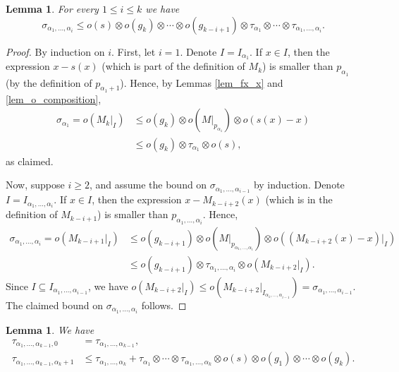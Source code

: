 \documentclass{article}
\newtheorem{Lemma}[Theorem]{Lemma}
\theoremstyle{definition}
\begin{document}
\begin{Lemma}\label{lem_sigma}
    For every $1\le i\le k$ we have
    \begin{equation*}
    \sigma_{\alpha_1,\ldots,\alpha_i}\le o(s)\otimes o(g_k)\otimes\cdots\otimes o(g_{k-i+1})\otimes \tau_{\alpha_1}\otimes\cdots\otimes \tau_{\alpha_1,\ldots,\alpha_i}.
    \end{equation*}
\end{Lemma}

\begin{proof}
    By induction on $i$. First, let $i=1$. Denote $I=I_{\alpha_1}$. If $x\in I$, then the expression $x-s(x)$ (which is part of the definition of $M_k$) is smaller than $p_{\alpha_1}$ (by the definition of $p_{\alpha_1+1}$). Hence, by Lemmas \ref{lem_fx_x} and \ref{lem_o_composition},
    \begin{align*}
        \sigma_{\alpha_1} = o(M_k|_I)&\le o(g_k)\otimes o(M|_{p_{\alpha_1}})\otimes o(s(x)-x)\\
        &\le o(g_k)\otimes \tau_{\alpha_1}\otimes o(s),
    \end{align*}
    as claimed.

    Now, suppose $i\ge 2$, and assume the bound on $\sigma_{\alpha_1,\ldots,\alpha_{i-1}}$ by induction. Denote $I=I_{\alpha_1,\ldots,\alpha_i}$. If $x\in I$, then the expression $x-M_{k-i+2}(x)$ (which is in the definition of $M_{k-i+1}$) is smaller than $p_{\alpha_1,\ldots,\alpha_i}$. Hence,
    \begin{align*}
        \sigma_{\alpha_1,\ldots,\alpha_i}=o(M_{k-i+1}|_{I})&\le o(g_{k-i+1})\otimes o(M|_{p_{\alpha_1,\ldots,\alpha_i}})\otimes o((M_{k-i+2}(x)-x)|_{I})\\
        &\le o(g_{k-i+1})\otimes\tau_{\alpha_1,\ldots,\alpha_i}\otimes o(M_{k-i+2}|_I).
    \end{align*}
    Since $I\subseteq I_{\alpha_1,\ldots,\alpha_{i-1}}$, we have $o(M_{k-i+2}|_I)\le o(M_{k-i+2}|_{I_{\alpha_1,\ldots,\alpha_{i-1}}}) = \sigma_{\alpha_1,\ldots,\alpha_{i-1}}$. The claimed bound on $\sigma_{\alpha_1,\ldots,\alpha_i}$ follows.
\end{proof}

\begin{Lemma}
    We have
    \begin{align*}
        \tau_{\alpha_1,\ldots,\alpha_{k-1},0}&=\tau_{\alpha_1,\ldots,\alpha_{k-1}},\\
        \tau_{\alpha_1,\ldots,\alpha_{k-1},\alpha_k+1} &\le \tau_{\alpha_1,\ldots,\alpha_k} + \tau_{\alpha_1}\otimes\cdots\otimes\tau_{\alpha_1,\ldots,\alpha_k}\otimes o(s)\otimes o(g_1)\otimes\cdots\otimes o(g_k).
    \end{align*}
\end{Lemma}
\end{document}

